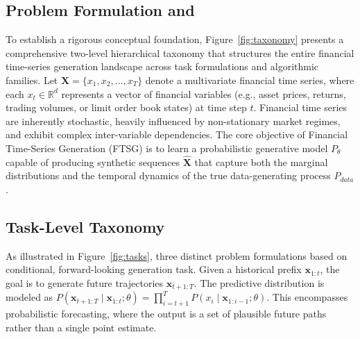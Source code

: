 \subsection{Problem Formulation and }
\label{sec:taxonomy}



To establish a rigorous conceptual foundation, Figure~\ref{fig:taxonomy} presents a comprehensive two-level hierarchical taxonomy that structures the entire financial time-series generation landscape across task formulations and algorithmic families.
Let $\mathbf{X} = \{x_1, x_2, \dots, x_T\}$ denote a multivariate financial time series, where each $x_t \in \mathbb{R}^d$ represents a vector of financial variables (e.g., asset prices, returns, trading volumes, or limit order book states) at time step $t$. Financial time series are inherently stochastic, heavily influenced by non-stationary market regimes, and exhibit complex inter-variable dependencies.
The core objective of Financial Time-Series Generation (FTSG) is to learn a probabilistic generative model $P_\theta$ capable of producing synthetic sequences $\hat{\mathbf{X}}$ that capture both the marginal distributions and the temporal dynamics of the true data-generating process $P_{data}$.

\subsection{Task-Level Taxonomy}
As illustrated in Figure~\ref{fig:tasks}, three distinct problem formulations based on conditional, forward-looking generation task. Given a historical prefix $\mathbf{x}_{1:t}$, the goal is to generate future trajectories $\mathbf{x}_{t+1:T}$. The predictive distribution is modeled as $P(\mathbf{x}_{t+1:T} \mid \mathbf{x}_{1:t}; \theta) = \prod_{i=t+1}^{T} P(x_i \mid \mathbf{x}_{1:i-1}; \theta)$. This encompasses probabilistic forecasting, where the output is a set of plausible future paths rather than a single point estimate.

